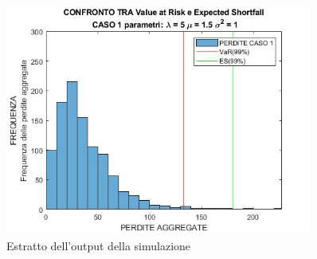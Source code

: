 \documentclass[titlepage]{article}
\begin{document}
\begin{itemize}
\begin{figure}[htbp]
\centering
\includegraphics[width=0.9\textwidth]{VAR VS ES.jpg}
\caption{\label{fig:numeroeventi.png}Estratto dell'output della simulazione }
\end{figure}


\end{itemize}
\end{document}

